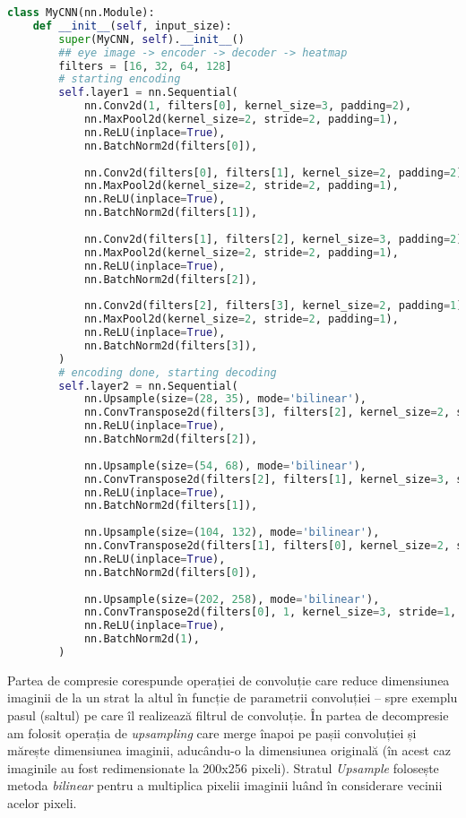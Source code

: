 \begin{lstlisting}[language=python]
class MyCNN(nn.Module):
    def __init__(self, input_size):
        super(MyCNN, self).__init__()
        ## eye image -> encoder -> decoder -> heatmap
        filters = [16, 32, 64, 128]
        # starting encoding
        self.layer1 = nn.Sequential(
            nn.Conv2d(1, filters[0], kernel_size=3, padding=2),
            nn.MaxPool2d(kernel_size=2, stride=2, padding=1),
            nn.ReLU(inplace=True),
            nn.BatchNorm2d(filters[0]),
            
            nn.Conv2d(filters[0], filters[1], kernel_size=2, padding=2),
            nn.MaxPool2d(kernel_size=2, stride=2, padding=1),
            nn.ReLU(inplace=True),
            nn.BatchNorm2d(filters[1]),
            
            nn.Conv2d(filters[1], filters[2], kernel_size=3, padding=2),
            nn.MaxPool2d(kernel_size=2, stride=2, padding=1),
            nn.ReLU(inplace=True),
            nn.BatchNorm2d(filters[2]),
            
            nn.Conv2d(filters[2], filters[3], kernel_size=2, padding=1),
            nn.MaxPool2d(kernel_size=2, stride=2, padding=1),
            nn.ReLU(inplace=True),
            nn.BatchNorm2d(filters[3]),
        )
        # encoding done, starting decoding
        self.layer2 = nn.Sequential(
            nn.Upsample(size=(28, 35), mode='bilinear'),
            nn.ConvTranspose2d(filters[3], filters[2], kernel_size=2, stride=1, padding=1),
            nn.ReLU(inplace=True),
            nn.BatchNorm2d(filters[2]),
            
            nn.Upsample(size=(54, 68), mode='bilinear'),
            nn.ConvTranspose2d(filters[2], filters[1], kernel_size=3, stride=1, padding=2),
            nn.ReLU(inplace=True),
            nn.BatchNorm2d(filters[1]),
            
            nn.Upsample(size=(104, 132), mode='bilinear'),
            nn.ConvTranspose2d(filters[1], filters[0], kernel_size=2, stride=1, padding=2),
            nn.ReLU(inplace=True),
            nn.BatchNorm2d(filters[0]),
        
            nn.Upsample(size=(202, 258), mode='bilinear'),
            nn.ConvTranspose2d(filters[0], 1, kernel_size=3, stride=1, padding=2),
            nn.ReLU(inplace=True),
            nn.BatchNorm2d(1),
        )
\end{lstlisting}

Partea de compresie corespunde operației de convoluție care reduce dimensiunea imaginii de la un strat la altul în funcție de parametrii convoluției – spre exemplu pasul (saltul) pe care îl realizează filtrul de convoluție.
În partea de decompresie am folosit operația de \emph{upsampling} care merge înapoi pe pașii convoluției și mărește dimensiunea imaginii, aducându-o la dimensiunea originală (în acest caz imaginile au fost redimensionate la 200x256 pixeli).
Stratul \emph{Upsample} folosește metoda \emph{bilinear} pentru a multiplica pixelii imaginii luând în considerare vecinii acelor pixeli.

